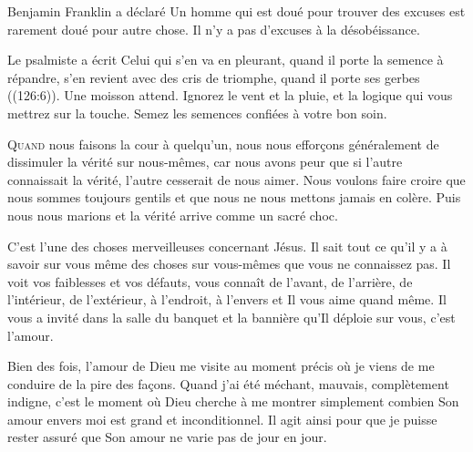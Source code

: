 Benjamin Franklin a déclaré\frcolon{} 
 \Og Un homme qui est doué pour trouver des excuses est rarement doué
 pour autre chose. \Fg{} Il n'y a pas d'excuses à la désobéissance. 


Le psalmiste a écrit\frcolon{} 
 \Og Celui qui s'en va en pleurant, quand il porte la semence à répandre,
 s'en revient avec des cris de triomphe, quand il porte ses gerbes \Fg{} 
 ((126:6)). Une moisson attend. Ignorez le vent et la pluie,
 et la logique qui vous mettrez sur la touche.
 Semez les semences confiées à votre bon soin.

\dvrule






\lettrine{Q}{uand} nous faisons la cour à quelqu'un,
 nous nous effor\c{c}ons généralement de dissimuler la vérité sur nous-mêmes,
 car nous avons peur que si l'autre connaissait la vérité,
 l'autre cesserait de nous aimer.
 Nous voulons faire croire que nous sommes toujours gentils
 et que nous ne nous mettons jamais en colère.
 Puis nous nous marions et la vérité arrive comme un sacré choc. 

C'est l'une des choses merveilleuses concernant Jésus.
 Il sait tout ce qu'il y a à savoir sur vous
 \ocadr même des choses sur vous-mêmes que vous ne connaissez pas.
 Il voit vos faiblesses et vos défauts, vous connaît de l'avant,
 de l'arrière, de l'intérieur, de l'extérieur, à l'endroit,
 à l'envers et Il vous aime quand même.
 Il vous a invité dans la salle du banquet et la bannière
 qu'Il déploie sur vous, c'est l'amour.

Bien des fois, l'amour de Dieu me visite au moment précis
 où je viens de me conduire de la pire des fa\c{c}ons.
 Quand j'ai été méchant, mauvais, complètement indigne,
 c'est le moment où Dieu cherche à me montrer simplement
 combien Son amour envers moi est grand et inconditionnel.
 Il agit ainsi pour que je puisse rester assuré que Son amour
 ne varie pas de jour en jour. 

